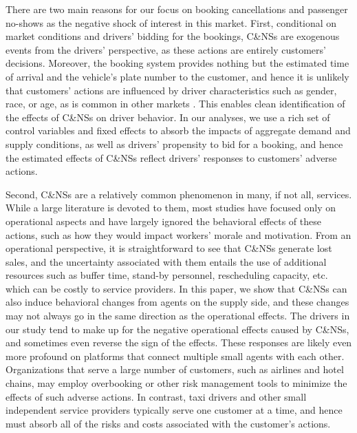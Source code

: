 \documentclass[reviewmode]{AEA}
\begin{document}
There are two main reasons for our focus on booking cancellations and passenger no-shows as the negative shock of interest in this market.
First, conditional on market conditions and drivers' bidding for the bookings, C\&NSs are exogenous events from the drivers' perspective, as  
these actions are entirely 
customers' decisions. Moreover, the booking system provides nothing but 
the estimated time of arrival and the vehicle's plate number to the customer, and hence it is unlikely that customers' actions are influenced by driver characteristics such as gender, race, or age, as is common in other markets \citep{mejia2018transparency,cui2016discrimination,edelman2017racial,NBERw22776}. This enables clean identification of the effects of C\&NSs on driver behavior. In our analyses, we use a rich set of control variables and fixed effects to absorb the impacts of aggregate demand and supply conditions, as well as drivers' propensity to bid for a booking, and hence the estimated effects of C\&NSs reflect drivers' responses to customers' adverse actions.

Second,  C\&NSs are a relatively common phenomenon in many, if not all, services. While a large literature is devoted to them,  most studies \citep{moore2001time,liu2010dynamic,feldman2014appointment,zacharias2014appointment} have focused only on operational aspects and have largely ignored the behavioral effects of these actions, such as how they would impact workers' morale and motivation.
From an operational perspective, it is straightforward to see that C\&NSs generate lost sales, and the uncertainty associated with them entails the use of additional resources such as buffer time, stand-by personnel, rescheduling capacity, etc. which can be costly to service providers.
In this paper, we show that C\&NSs can also induce behavioral changes from agents on the supply side, and these changes may not always go in the same direction as the operational effects.
The  drivers in our study tend to make up for the negative operational effects caused by C\&NSs, and sometimes even reverse the sign of the effects.
These responses are likely even more profound on platforms that connect multiple small agents with each other.
Organizations that serve a large number of customers, such as airlines and hotel chains, may employ overbooking or other risk management tools to minimize the effects of such adverse actions.
In contrast, taxi drivers and other small independent service providers typically serve one customer at a time, and hence must absorb all of the risks and costs associated with the customer's actions.
\end{document}
